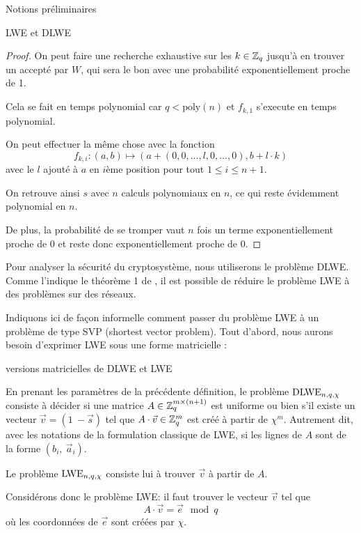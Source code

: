 \begin{section}{Notions préliminaires}
\begin{subsection}{LWE et DLWE}
\begin{proof}
	On peut faire une recherche exhaustive sur les $k \in \mathbb{Z}_q$ jusqu'à en trouver un accepté par $W$, qui sera le
	bon avec une probabilité exponentiellement proche de 1.
	
	Cela se fait en temps polynomial car $q < \text{poly}(n)$ et $f_{k,1}$ s'execute en temps polynomial.
	
	On peut effectuer la même chose avec la fonction
	\[f_{k,i}: (a,b) \mapsto (a + (0, 0, ..., l, 0, ..., 0), b + l \cdot k) \]
	avec le $l$ ajouté à $a$ en $i$ème position pour tout $1 \leqslant i \leqslant n+1$.
	
	On retrouve ainsi $s$ avec $n$ calculs polynomiaux en $n$, ce qui reste évidemment polynomial en $n$.
	
	De plus, la probabilité de se tromper vaut $n$ fois un terme exponentiellement proche de 0 et reste donc
	exponentiellement proche de 0.
	\end{proof}

	Pour analyser la sécurité du cryptosystème, nous utiliserons le problème DLWE. Comme l'indique le théorème 1 de
	\cite{C:GenSahWat13}, il est possible de réduire le problème LWE à des problèmes sur des réseaux.

	Indiquons ici de façon informelle comment passer du problème LWE à un problème de type SVP (shortest vector
	problem). Tout d'abord, nous aurons besoin d'exprimer LWE sous une forme matricielle :

	\begin{definition}{versions matricielles de DLWE et LWE}

	En prenant les paramètres de la précédente définition, le problème $\text{DLWE}_{n,q,\chi}$ consiste à décider si une matrice $A
	\in \mathbb{Z}_q^{m \times (n+1)}$ est uniforme ou bien s'il existe un vecteur $\vec{v} = (1\: -\!\vec{s})$ tel que $A
	\cdot \vec{v} \in \mathbb{Z}_q^{m}$ est créé à partir de $\chi^m$. Autrement dit, avec les notations de la formulation
	classique de LWE, si les lignes de $A$ sont de la forme $(b_i,\: \vec{a}_i)$.
	
	Le problème $\text{LWE}_{n,q,\chi}$ consiste lui à trouver $\vec{v}$ à partir de $A$.
	\end{definition}

	Considérons donc le problème LWE: il faut trouver le vecteur $\vec{v}$ tel que
	\[ A\cdot \vec{v} = \vec{e} \mod q \]
	où les coordonnées de $\vec{e}$ sont créées par $\chi$.


\end{subsection}
\end{section}
